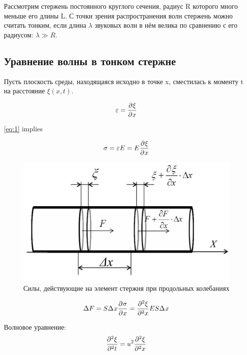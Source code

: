 \documentclass[a4paper,12pt]{article} %
\begin{document}
Рассмотрим стержень постоянного круглого сечения, радиус R которого много меньше его длины L. С точки зрения распространения волн стержень можно считать тонким, если длина $\lambda$ звуковых волн в нём велика по сравнению с его радиусом: $\lambda \gg R$.

\subsection{Уравнение волны в тонком стержне}
Пусть плоскость среды, находящаяся исходно в точке x,
сместилась к моменту t на расстояние $\xi(x,t)$.

\begin{equation}
  \varepsilon = \partderiv{\xi}{x}
  \label{eq:3}
\end{equation}

\eqref{eq:1} implies

\begin{equation}
  \sigma =  \varepsilon E = E \partderiv{\xi}{x}
  \label{eq:4}
\end{equation}

\begin{figure} [h] \center
  \includegraphics[scale=0.3]{148/pic 1.png}
  \caption[Рис. 1]{Силы, действующие на элемент стержня при продольных колебаниях}
\end{figure}

\begin{equation}
  \Delta F = S \D{x} \partderiv{\sigma}{x} = 
  \partderiv[2]{\xi}{x} E S \D{x}
  \label{eq:5}
\end{equation}

Волновое уравнение:
\begin{equation}
  \partderiv[2]{\xi}{t} = u^2 \partderiv[2]{\xi}{x}
  \label{eq:6}
\end{equation}
\end{document}
